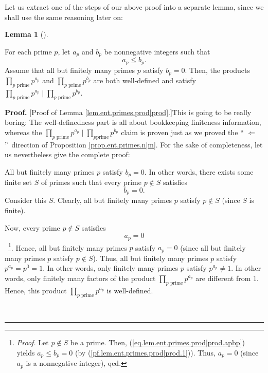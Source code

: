\documentclass[numbers=enddot,12pt,final,onecolumn,notitlepage]{scrartcl}%
\numberwithin{exer}{subsection}
\theoremstyle{definition}
\newtheorem{lem}[theo]{Lemma}
\newenvironment{lemma}[1][]
{\begin{lem}[#1]\begin{leftbar}}
{\end{leftbar}\end{lem}}
\newenvironment{fineprint}{\begin{small}}{\end{small}}
\newenvironment{proof}[1][Proof]{\noindent\textbf{#1.} }{\ \rule{0.5em}{0.5em}}
\let\prodnonlimits\prod
\renewcommand{\prod}{\prodnonlimits\limits}
\begin{document}
Let us extract one of the steps of our above proof into a separate lemma,
since we shall use the same reasoning later on:

\begin{lemma}
\label{lem.ent.primes.prod|prod}For each prime $p$, let $a_{p}$ and $b_{p}$ be
nonnegative integers such that
\begin{equation}
a_{p}\leq b_{p}. \label{eq.lem.ent.primes.prod|prod.apbp}%
\end{equation}
Assume that all but finitely many primes $p$ satisfy $b_{p}=0$. Then, the
products $\prod_{p\text{ prime}}p^{a_{p}}$ and $\prod_{p\text{ prime}}%
p^{b_{p}}$ are both well-defined and satisfy $\prod_{p\text{ prime}}p^{a_{p}%
}\mid\prod_{p\text{ prime}}p^{b_{p}}$.
\end{lemma}

\begin{proof}
[Proof of Lemma \ref{lem.ent.primes.prod|prod}.]This is going to be really
boring: The well-definedness part is all about bookkeeping finiteness
information, whereas the $\prod_{p\text{ prime}}p^{a_{p}}\mid\prod_{p\text{
prime}}p^{b_{p}}$ claim is proven just as we proved the \textquotedblleft%
$\Longleftarrow$\textquotedblright\ direction of Proposition
\ref{prop.ent.primes.n|m}. For the sake of completeness, let us nevertheless
give the complete proof:

\begin{fineprint}
All but finitely many primes $p$ satisfy $b_{p}=0$. In other words, there
exists some finite set $S$ of primes such that every prime $p\notin S$
satisfies
\begin{equation}
b_{p}=0. \label{pf.lem.ent.primes.prod|prod.1}%
\end{equation}
Consider this $S$. Clearly, all but finitely many primes $p$ satisfy $p\notin
S$ (since $S$ is finite).

Now, every prime $p\notin S$ satisfies
\begin{equation}
a_{p}=0 \label{pf.lem.ent.primes.prod|prod.2}%
\end{equation}
\ \footnote{\textit{Proof.} Let $p\notin S$ be a prime. Then,
(\ref{eq.lem.ent.primes.prod|prod.apbp}) yields $a_{p}\leq b_{p}=0$ (by
(\ref{pf.lem.ent.primes.prod|prod.1})). Thus, $a_{p}=0$ (since $a_{p}$ is a
nonnegative integer), qed.}. Hence, all but finitely many primes $p$ satisfy
$a_{p}=0$ (since all but finitely many primes $p$ satisfy $p\notin S$). Thus,
all but finitely many primes $p$ satisfy $p^{a_{p}}=p^{0}=1$. In other words,
only finitely many primes $p$ satisfy $p^{a_{p}}\neq1$. In other words, only
finitely many factors of the product $\prod_{p\text{ prime}}p^{a_{p}}$ are
different from $1$. Hence, this product $\prod_{p\text{ prime}}p^{a_{p}}$ is well-defined.


\end{fineprint}
\end{proof}
\end{document}
